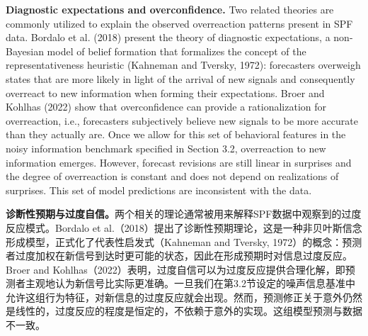 \documentclass[12pt,a4paper]{article}
\newenvironment{original}
  {\par\medskip\noindent\ignorespaces}
  {\par\medskip}
\newenvironment{translation}
  {\par\noindent{\color{transblue}\ignorespaces}}
  {\par\bigskip}
\begin{document}
\begin{original}
\textbf{Diagnostic expectations and overconfidence.} Two related theories are commonly utilized to explain the observed overreaction patterns present in SPF data. Bordalo et al. (2018) present the theory of diagnostic expectations, a non-Bayesian model of belief formation that formalizes the concept of the representativeness heuristic (Kahneman and Tversky, 1972): forecasters overweigh states that are more likely in light of the arrival of new signals and consequently overreact to new information when forming their expectations. Broer and Kohlhas (2022) show that overconfidence can provide a rationalization for overreaction, i.e., forecasters subjectively believe new signals to be more accurate than they actually are. Once we allow for this set of behavioral features in the noisy information benchmark specified in Section 3.2, overreaction to new information emerges. However, forecast revisions are still linear in surprises and the degree of overreaction is constant and does not depend on realizations of surprises. This set of model predictions are inconsistent with the data.
\end{original}
\begin{translation}
\textbf{诊断性预期与过度自信。}两个相关的理论通常被用来解释SPF数据中观察到的过度反应模式。Bordalo et al.（2018）提出了诊断性预期理论，这是一种非贝叶斯信念形成模型，正式化了代表性启发式（Kahneman and Tversky, 1972）的概念：预测者过度加权在新信号到达时更可能的状态，因此在形成预期时对信息过度反应。Broer and Kohlhas（2022）表明，过度自信可以为过度反应提供合理化解，即预测者主观地认为新信号比实际更准确。一旦我们在第3.2节设定的噪声信息基准中允许这组行为特征，对新信息的过度反应就会出现。然而，预测修正关于意外仍然是线性的，过度反应的程度是恒定的，不依赖于意外的实现。这组模型预测与数据不一致。
\end{translation}
\end{document}
